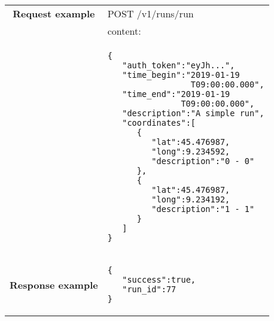 \begin{adjustwidth}{1cm}{}
\begin{longtable}{|c|l|}
                               \textbf{Request example}
             & POST /v1/runs/run \\
             & content: \\
            & \begin{minipage}[t]{0.5\textwidth}
                \begin{adjustwidth}{1.5cm}{}
                \begin{verbatim}
{
   "auth_token":"eyJh...",
   "time_begin":"2019-01-19
                 T09:00:00.000",
   "time_end":"2019-01-19
               T09:00:00.000",
   "description":"A simple run",
   "coordinates":[
      {
         "lat":45.476987,
         "long":9.234592,
         "description":"0 - 0"
      },
      {
         "lat":45.476987,
         "long":9.234192,
         "description":"1 - 1"
      }
   ]
}
                \end{verbatim}
                \end{adjustwidth}
              \end{minipage} \\
            \hline
             \textbf{Response example} & 
              \begin{minipage}[t]{0.5\textwidth}
                \begin{adjustwidth}{1.5cm}{}
                \begin{verbatim}
{
   "success":true,
   "run_id":77
}
                \end{verbatim}
                \end{adjustwidth}
              \end{minipage} \\
              \hline
 
 
 
            \end{longtable}
        \end{adjustwidth}

